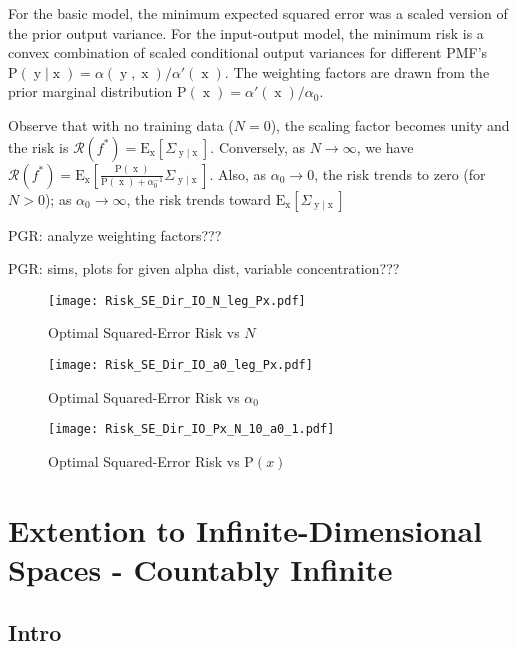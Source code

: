 \documentclass[12pt]{report}
\DeclareMathOperator{\xrm}{\mathrm{x}}
\DeclareMathOperator{\yrm}{\mathrm{y}}
\begin{document}
For the basic model, the minimum expected squared error was a scaled version of the prior output variance. For the input-output model, the minimum risk is a convex combination of scaled conditional output variances for different PMF's $\text{P}(\yrm | \xrm) = \alpha(\yrm,\xrm)/\alpha'(\xrm)$. The weighting factors are drawn from the prior marginal distribution $\text{P}(\xrm) = \alpha'(\xrm)/\alpha_0$.

Observe that with no training data ($N = 0$), the scaling factor becomes unity and the risk is $\mathcal{R}(f^*) = \text{E}_{\xrm} \left[ \Sigma_{\yrm | \xrm} \right]$. Conversely, as $N \to \infty$, we have $\mathcal{R}(f^*) = \text{E}_{\xrm} \left[ \frac{\text{P}(\xrm)}{\text{P}(\xrm) + \alpha_0^{-1}} \Sigma_{\yrm | \xrm} \right]$. Also, as $\alpha_0 \to 0$, the risk trends to zero (for $N > 0$); as $\alpha_0 \to \infty$, the risk trends toward $\text{E}_{\xrm} \left[ \Sigma_{\yrm | \xrm} \right]$



PGR: analyze weighting factors???

PGR: sims, plots for given alpha dist, variable concentration???


\begin{figure}
\centering
\texttt{[image: Risk\_SE\_Dir\_IO\_N\_leg\_Px.pdf]}
\caption{Optimal Squared-Error Risk vs $N$}
\label{fig:Risk_SE_Dir_IO_N_leg_Px}
\end{figure}

\begin{figure}
\centering
\texttt{[image: Risk\_SE\_Dir\_IO\_a0\_leg\_Px.pdf]}
\caption{Optimal Squared-Error Risk vs $\alpha_0$}
\label{fig:Risk_SE_Dir_IO_a0_leg_Px}
\end{figure}

\begin{figure}
\centering
\texttt{[image: Risk\_SE\_Dir\_IO\_Px\_N\_10\_a0\_1.pdf]}
\caption{Optimal Squared-Error Risk vs $\text{P}(x)$}
\label{fig:Risk_SE_Dir_IO_Px_N_10_a0_1}
\end{figure}










\chapter{Extention to Infinite-Dimensional Spaces - Countably Infinite}


\section{Intro}
\end{document}
